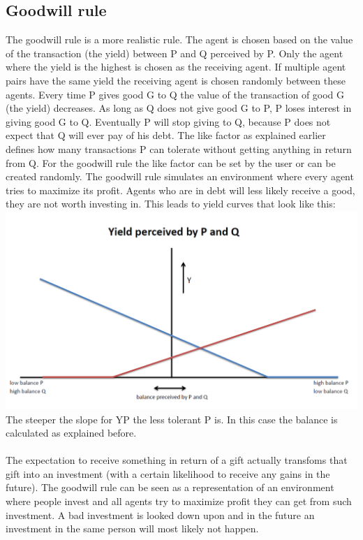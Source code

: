 \documentclass[twoside,openright]{uva-bachelor-thesis}
\begin{document}
\subsection{Goodwill rule}
The goodwill rule is a more realistic rule. The agent is chosen based on the value of the transaction (the yield) between P and Q perceived by P. Only the agent where the yield is the highest is chosen as the receiving agent. If multiple agent pairs have the same yield the receiving agent is chosen randomly between these agents. Every time P gives good G to Q the value of the transaction of good G (the yield) decreases. As long as Q does not give good G to P, P loses interest in giving good G to Q. Eventually P will stop giving to Q, because P does not expect that Q will ever pay of his debt. The like factor as explained earlier defines how many transactions P can tolerate without getting anything in return from Q. For the goodwill rule the like factor can be set by the user or can be created randomly. The goodwill rule simulates an environment where every agent tries to maximize its profit. Agents who are in debt will less likely receive a good, they are not worth investing in.
This leads to yield curves that look like this: \\
\includegraphics[scale=0.4]{YieldCurves/yieldcurve_PQ} \\
The steeper the slope for YP the less tolerant P is. In this case the balance is calculated as explained before.
\\
\\
The expectation to receive something in return of a gift actually transfoms that gift into an investment (with a certain likelihood to receive any gains in the future). The goodwill rule can be seen as a representation of an environment where people invest and all agents try to maximize profit they can get from such investment. A bad investment is looked down upon and in the future an investment in the same person will most likely not happen.
\end{document}
